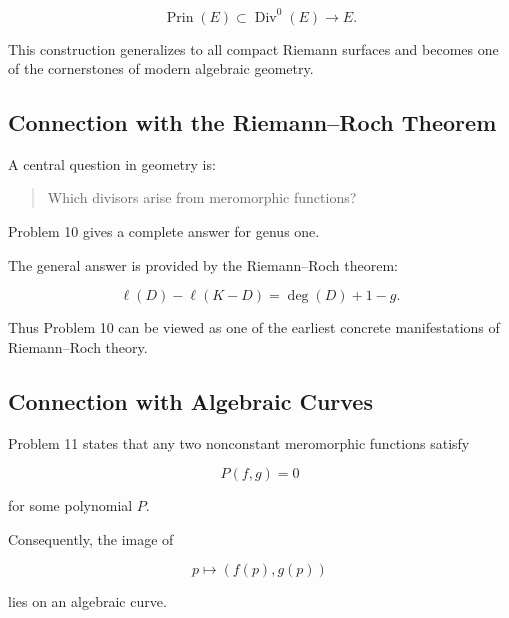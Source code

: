 \documentclass[12pt,a4paper]{article}
\theoremstyle{notespace}
\begin{document}
\[
\operatorname{Prin}(E)
\subset
\operatorname{Div}^0(E)
\longrightarrow
E.
\]

This construction generalizes to all compact Riemann surfaces and becomes one of the cornerstones of modern algebraic geometry.

\subsection{Connection with the Riemann--Roch Theorem}

A central question in geometry is:

\begin{quote}
	Which divisors arise from meromorphic functions?
\end{quote}

Problem 10 gives a complete answer for genus one.

The general answer is provided by the Riemann--Roch theorem:

\[
\ell(D)-\ell(K-D)
=
\deg(D)+1-g.
\]

Thus Problem 10 can be viewed as one of the earliest concrete manifestations of Riemann--Roch theory.

\subsection{Connection with Algebraic Curves}

Problem 11 states that any two nonconstant meromorphic functions satisfy

\[
P(f,g)=0
\]

for some polynomial \(P\).

Consequently, the image of

\[
p\mapsto(f(p),g(p))
\]

lies on an algebraic curve.

\begin{center}
\end{center}
\end{document}
